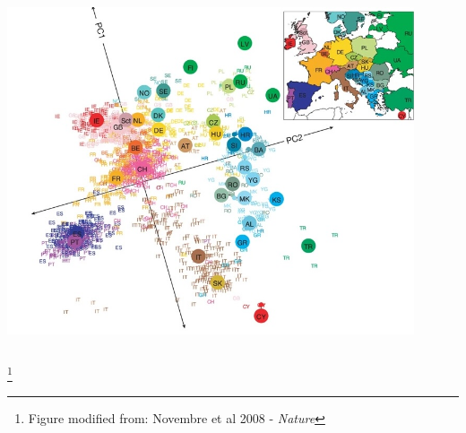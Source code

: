 \documentclass[xcolor=dvipsnames]{beamer}
\newcommand\blfootnote[1]{%
	\begingroup
	\renewcommand\thefootnote{}\footnote{#1}%
	\addtocounter{footnote}{-1}%
	\endgroup
}
\begin{document}
\begin{frame}
\begin{columns}
\begin{column}{0.7\textwidth}
\begin{itemize}
			\includegraphics[keepaspectratio, width  = 0.9\textwidth]{img/human_pca}				
		\end{itemize}
	\end{column}
\end{columns}
\blfootnote{Figure modified from: Novembre et al 2008 - \textit{Nature}}
\end{frame}
\end{document}
